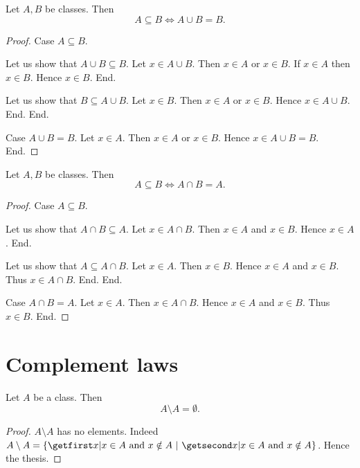 \documentclass[../set-theory.tex]{subfiles}
\begin{document}
  \begin{forthel}
    \begin{proposition}\label{SET_THEORY_02_6657236858306560}
      Let $A, B$ be classes.
      Then \[ A \subseteq B \iff A \cup B = B. \]
    \end{proposition}
    \begin{proof}
      Case $A \subseteq B$.

        Let us show that $A \cup B \subseteq B$.
          Let $x \in A \cup B$.
          Then $x \in A$ or $x \in B$.
          If $x \in A$ then $x \in B$.
          Hence $x \in B$.
        End.

        Let us show that $B \subseteq A \cup B$.
          Let $x \in B$.
          Then $x \in A$ or $x \in B$.
          Hence $x \in A \cup B$.
        End.
      End.

      Case $A \cup B = B$.
        Let $x \in A$.
        Then $x \in A$ or $x \in B$.
        Hence $x \in A \cup B = B$.
      End.
    \end{proof}
  \end{forthel}

  \begin{forthel}
    \begin{proposition}\label{SET_THEORY_02_2356449346846720}
      Let $A, B$ be classes.
      Then \[ A \subseteq B \iff A \cap B = A. \]
    \end{proposition}
    \begin{proof}
      Case $A \subseteq B$.

        Let us show that $A \cap B \subseteq A$.
          Let $x \in A \cap B$.
          Then $x \in A$ and $x \in B$.
          Hence $x \in A$.
        End.

        Let us show that $A \subseteq A \cap B$.
          Let $x \in A$.
          Then $x \in B$.
          Hence $x \in A$ and $x \in B$.
          Thus $x \in A \cap B$.
        End.
      End.

      Case $A \cap B = A$.
        Let $x \in A$.
        Then $x \in A \cap B$.
        Hence $x \in A$ and $x \in B$.
        Thus $x \in B$.
      End.
    \end{proof}
  \end{forthel}


  \section*{Complement laws}

  \begin{forthel}
    \begin{proposition}\label{SET_THEORY_02_7433299337150464}
      Let $A$ be a class.
      Then \[ A \setminus A = \emptyset. \]
    \end{proposition}
    \begin{proof}
      $A \setminus A$ has no elements.
      Indeed $A \setminus A = \class{ x | \text{$x \in A$ and $x \notin A$} }$.
      Hence the thesis.
    \end{proof}
  \end{forthel}
\end{document}

